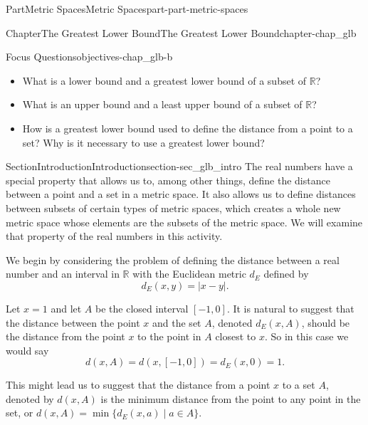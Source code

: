 \documentclass[oneside,10pt,]{book}
\numberwithin{equation}{chapter}
\newcommand{\R}{\mathbb{R}}
\begin{document}
\begin{partptx}{Part}{Metric Spaces}{}{Metric Spaces}{}{}{part-part-metric-spaces}
\begin{chapterptx}{Chapter}{The Greatest Lower Bound}{}{The Greatest Lower Bound}{}{}{chapter-chap_glb}
\renewcommand*{\chaptername}{Chapter}
\begin{objectives}{Focus Questions}{objectives-chap_glb-b}
%
\begin{itemize}[label=\textbullet]
\item{}What is a lower bound and a greatest lower bound of a subset of \(\R\)?%
\item{}What is an upper bound and a least upper bound of a subset of \(\R\)?%
\item{}How is a greatest lower bound used to define the distance from a point to a set? Why is it necessary to use a greatest lower bound?%
\end{itemize}
\end{objectives}
%
%
\typeout{************************************************}
\typeout{************************************************}
%
\begin{sectionptx}{Section}{Introduction}{}{Introduction}{}{}{section-sec_glb_intro}
The real numbers have a special property that allows us to, among other things, define the distance between a point and a set in a metric space. It also allows us to define distances between subsets of certain types of metric spaces, which creates a whole new metric space whose elements are the subsets of the metric space. We will examine that property of the real numbers in this activity.%
\par
We begin by considering the problem of defining the distance between a real number and an interval in \(\R\) with the Euclidean metric \(d_E\) defined by%
\begin{equation*}
d_E(x,y) = | x-y |\text{.}
\end{equation*}
%
\par
Let \(x = 1\) and let \(A\) be the closed interval \([-1,0]\). It is natural to suggest that the distance between the point \(x\) and the set \(A\), denoted \(d_E(x,A)\), should be the distance from the point \(x\) to the point in \(A\) closest to \(x\). So in this case we would say%
\begin{equation*}
d(x,A) = d(x,[-1,0]) = d_E(x,0) = 1\text{.}
\end{equation*}
%
\par
This might lead us to suggest that the distance from a point \(x\) to a set \(A\), denoted by \(d(x,A)\) is the minimum distance from the point to any point in the set, or \(d(x,A) = \min\{d_E(x,a) \mid a \in A\}\).%
\par

\end{sectionptx}
\end{chapterptx}
\end{partptx}
\end{document}
